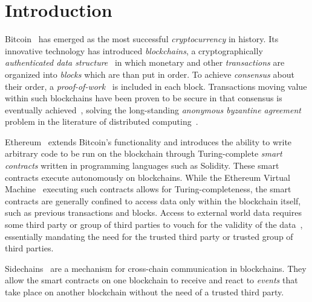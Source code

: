\section{Introduction}

Bitcoin~\cite{bitcoin} has emerged as the most successful \emph{cryptocurrency}
in history. Its innovative technology has introduced \emph{blockchains}, a
cryptographically \emph{authenticated data
structure}~\cite{miller2014authenticated} in which monetary and other
\emph{transactions} are organized into \emph{blocks} which are than put in
order. To achieve \emph{consensus} about their order,
a \emph{proof-of-work}~\cite{C:DwoNao92} is included in each block. Transactions
moving value within such blockchains have been proven to be secure in that
consensus is eventually achieved~\cite{EC:GarKiaLeo15,C:GarKiaLeo17}, solving
the long-standing \emph{anonymous byzantine agreement} problem in the literature
of distributed computing~\cite{miller2014anonymous}.

Ethereum~\cite{buterin} extends Bitcoin's functionality and introduces the
ability to write arbitrary code to be run on the blockchain through
Turing-complete \emph{smart contracts} written in programming languages such as
Solidity. These smart contracts execute autonomously on blockchains.
While the Ethereum Virtual Machine~\cite{wood} executing such contracts allows
for Turing-completeness, the smart contracts are generally confined to access
data only within the blockchain itself, such as previous transactions and
blocks. Access to external world data requires some third party or group of
third parties to vouch for the validity of the data~\cite{CCS:ZCCJS16},
essentially mandating the need for the trusted third party or trusted group of
third parties.

Sidechains~\cite{sidechains} are a mechanism for cross-chain communication in
blockchains. They allow the smart contracts on one blockchain to receive and
react to \textit{events} that take place on another blockchain without the need
of a trusted third party.

